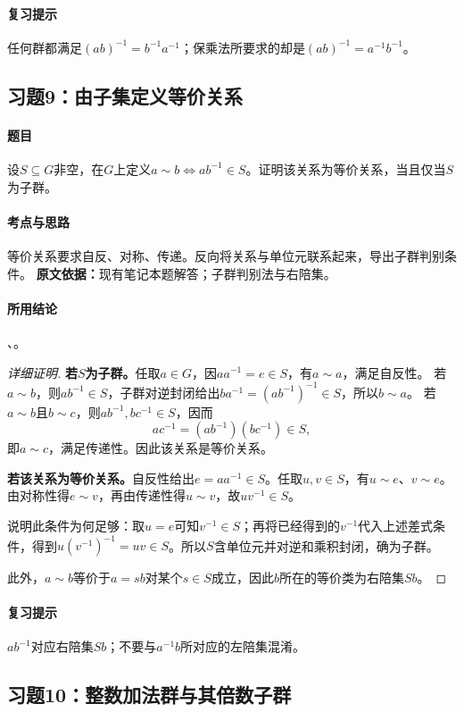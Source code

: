 \paragraph{复习提示}
任何群都满足$(ab)^{-1}=b^{-1}a^{-1}$；保乘法所要求的却是$(ab)^{-1}=a^{-1}b^{-1}$。

\subsection{习题9：由子集定义等价关系}
\paragraph{题目}
设$S\subseteq G$非空，在$G$上定义$a\sim b\iff ab^{-1}\in S$。证明该关系为等价关系，当且仅当$S$为子群。
\paragraph{考点与思路}
等价关系要求自反、对称、传递。反向将关系与单位元联系起来，导出子群判别条件。
\textbf{原文依据：}现有笔记本题解答；子群判别法与右陪集。
\paragraph{所用结论}
、。
\begin{proof}[详细证明]
\textbf{若$S$为子群。}任取$a\in G$，因$aa^{-1}=e\in S$，有$a\sim a$，满足自反性。
若$a\sim b$，则$ab^{-1}\in S$，子群对逆封闭给出$ba^{-1}=(ab^{-1})^{-1}\in S$，所以$b\sim a$。
若$a\sim b$且$b\sim c$，则$ab^{-1},bc^{-1}\in S$，因而
\[
ac^{-1}=(ab^{-1})(bc^{-1})\in S,
\]
即$a\sim c$，满足传递性。因此该关系是等价关系。

\textbf{若该关系为等价关系。}自反性给出$e=aa^{-1}\in S$。任取$u,v\in S$，有$u\sim e$、$v\sim e$。由对称性得$e\sim v$，再由传递性得$u\sim v$，故$uv^{-1}\in S$。

说明此条件为何足够：取$u=e$可知$v^{-1}\in S$；再将已经得到的$v^{-1}$代入上述差式条件，得到$u(v^{-1})^{-1}=uv\in S$。所以$S$含单位元并对逆和乘积封闭，确为子群。

此外，$a\sim b$等价于$a=sb$对某个$s\in S$成立，因此$b$所在的等价类为右陪集$Sb$。
\end{proof}
\paragraph{复习提示}
$ab^{-1}$对应右陪集$Sb$；不要与$a^{-1}b$所对应的左陪集混淆。

\subsection{习题10：整数加法群与其倍数子群}
